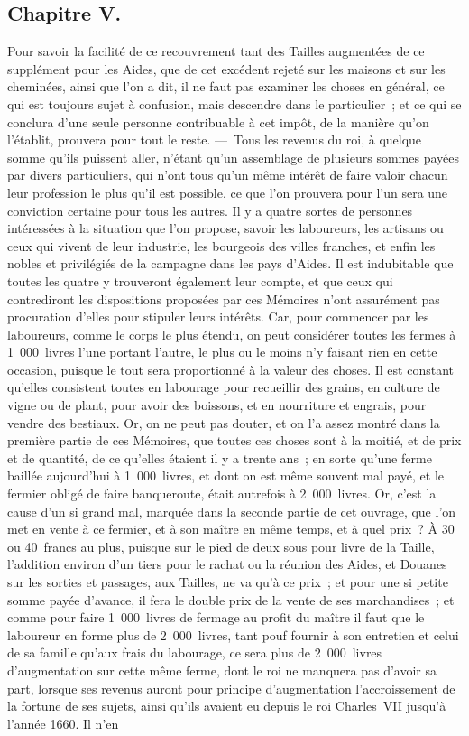 \documentclass[french,twoside]{book} %
\begin{document}
\subsection[{Chapitre V.}]{Chapitre V.}
\noindent Pour savoir la facilité de ce recouvrement tant des Tailles augmentées de ce supplément pour les Aides, que de cet excédent rejeté sur les maisons et sur les cheminées, ainsi que l’on a dit, il ne faut pas examiner les choses en général, ce qui est toujours sujet à confusion, mais descendre dans le particulier ; et ce qui se conclura d’une seule personne contribuable à cet impôt, de la manière qu’on l’établit, prouvera pour tout le reste. — Tous les revenus du roi, à quelque somme qu’ils puissent aller, n’étant qu’un assemblage de plusieurs sommes payées par divers particuliers, qui n’ont tous qu’un même intérêt de faire valoir chacun leur profession le plus qu’il est possible, ce que l’on prouvera pour l’un sera une conviction certaine pour tous les autres. Il y a quatre sortes de personnes intéressées à la situation que l’on propose, savoir les laboureurs, les artisans ou ceux qui vivent de leur industrie, les bourgeois des villes franches, et enfin les nobles et privilégiés de la campagne dans les pays d’Aides. Il est indubitable que toutes les quatre y trouveront également leur compte, et que ceux qui contrediront les dispositions proposées par ces Mémoires n’ont assurément pas procuration d’elles pour stipuler leurs intérêts. Car, pour commencer par les laboureurs, comme le corps le plus étendu, on peut considérer toutes les fermes à 1 000 livres l’une portant l’autre, le plus ou le moins n’y faisant rien en cette occasion, puisque le tout sera proportionné à la valeur des choses. Il est constant qu’elles consistent toutes en labourage pour recueillir des grains, en culture de vigne ou de plant, pour avoir des boissons, et en nourriture et engrais, pour vendre des bestiaux. Or, on ne peut pas douter, et on l’a assez montré dans la première partie de ces Mémoires, que toutes ces choses sont à la moitié, et de prix et de quantité, de ce qu’elles étaient il y a trente ans ; en sorte qu’une ferme baillée aujourd’hui à 1 000 livres, et dont on est même souvent mal payé, et le fermier obligé de faire banqueroute, était autrefois à 2 000 livres. Or, c’est la cause d’un si grand mal, marquée dans la seconde partie de cet ouvrage, que l’on met en vente à ce fermier, et à son maître en même temps, et à quel prix ? À 30 ou 40 francs au plus, puisque sur le pied de deux sous pour livre de la Taille, l’addition environ d’un tiers pour le rachat ou la réunion des Aides, et Douanes sur les sorties et passages, aux Tailles, ne va qu’à ce prix ; et pour une si petite somme payée d’avance, il fera le double prix de la vente de ses marchandises ; et comme pour faire 1 000 livres de fermage au profit du maître il faut que le laboureur en forme plus de 2 000 livres, tant pouf fournir à son entretien et celui de sa famille qu’aux frais du labourage, ce sera plus de 2 000 livres d’augmentation sur cette même ferme, dont le roi ne manquera pas d’avoir sa part, lorsque ses revenus auront pour principe d’augmentation l’accroissement de la fortune de ses sujets, ainsi qu’ils avaient eu depuis le roi Charles VII jusqu’à l’année 1660. Il n’en 
\end{document}
